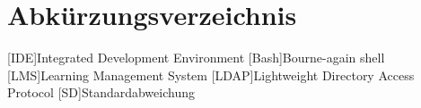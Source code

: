 \section*{Abkürzungsverzeichnis} 

\begin{acronym}[Bash]
    [IDE]{Integrated Development Environment}
    [Bash]{Bourne-again shell}
    [LMS]{Learning Management System}
    [LDAP]{Lightweight Directory Access Protocol}
    [SD]{Standardabweichung}
\end{acronym}